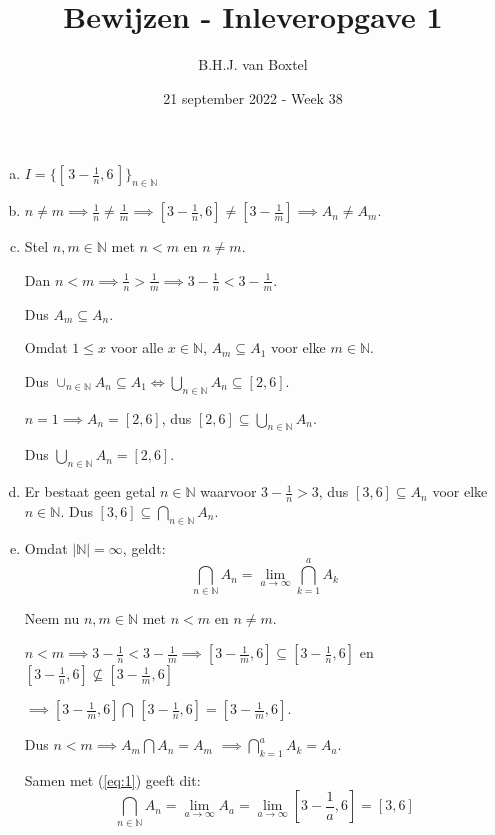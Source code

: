 \documentclass[12pt, a4paper]{article}
\begin{document}
\title{Bewijzen - Inleveropgave 1}
\author{B.H.J. van Boxtel}
\date{21 september 2022 - Week 38} 

\maketitle
{}

\begin{enumerate}[(a).] 
    \item $I = \{[\, 3 - \frac{1}{n}, 6 \,]\}_{n \in \mathbb{N}}$
    \bigskip
    \item $n \neq m \implies \frac{1}{n} \neq \frac{1}{m} \implies [3 -\frac{1}{n}, 6] \neq [3 - \frac{1}{m}] \implies A_n \neq A_m$.
    \bigskip
    \item Stel $n,m \in \mathbb{N}$ met $n < m$ en $n \neq m$.
    
    Dan $n < m \implies \frac{1}{n} > \frac{1}{m} \implies 3 - \frac{1}{n} < 3 - \frac{1}{m}$.

    Dus $A_m \subseteq A_n$.

    Omdat $1 \leq x$ voor alle $x \in \mathbb{N}$, $ A_m \subseteq A_1$ voor elke $m \in \mathbb{N}$.

    Dus $\cup_{n \in \mathbb{N}} A_n \subseteq A_1 \iff \bigcup_{n \in \mathbb{N}} A_n \subseteq [2,6]$.
    \bigskip

    $n = 1 \implies A_n = [2,6]$, dus $[2,6] \subseteq \bigcup_{n \in \mathbb{N}} A_n$.

    Dus $\bigcup_{n \in \mathbb{N}} A_n = [2,6]$.
    \bigskip

    \item Er bestaat geen getal $n \in \mathbb{N}$ waarvoor $3 - \frac{1}{n} > 3$, dus $[3,6] \subseteq A_n$ voor elke $n \in \mathbb{N}$. Dus $[3,6] \subseteq \bigcap_{n \in \mathbb{N}} A_n$.
    \bigskip

    \item Omdat $\lvert \mathbb{N} \rvert = \infty$, geldt:
    \begin{equation} \label{eq:1}
        \bigcap_{n \in \mathbb{N}} A_n = \lim_{a\to\infty}\bigcap_{k = 1}^{a} A_k
    \end{equation}

    Neem nu $n,m \in \mathbb{N}$ met $n < m$ en $n \neq m$.

    $n < m \implies 3 - \frac{1}{n} < 3 - \frac{1}{m} \implies [3 - \frac{1}{m}, 6] \subseteq [3 - \frac{1}{n}, 6]$ en $[3 - \frac{1}{n}, 6] \nsubseteq [3 - \frac{1}{m}, 6]$
    
    $\implies [3 - \frac{1}{m}, 6] \bigcap \, [3 - \frac{1}{n}, 6] = [3 - \frac{1}{m}, 6].$ 
    
    Dus $n < m \implies A_m \bigcap A_n = A_m$ $\implies \bigcap_{k = 1}^{a} A_k = A_a$.
    \bigskip

    Samen met (\ref{eq:1}) geeft dit:
    \begin{equation}
        \bigcap_{n \in \mathbb{N}} A_n = \lim_{a\to\infty}A_a = \lim_{a\to\infty} [3 - \frac{1}{a}, 6] = [3 , 6]
    \end{equation}

\end{enumerate}
\end{document}
